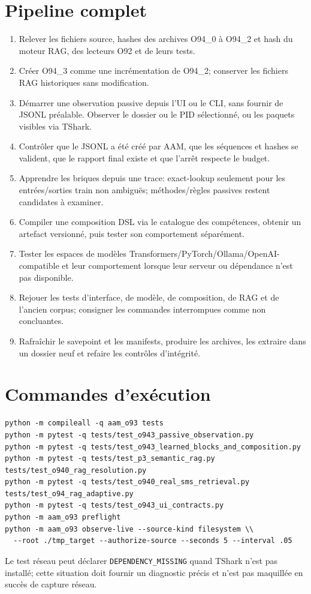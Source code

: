 \documentclass[11pt,a4paper]{article}
\begin{document}
\section{Pipeline complet}
\begin{enumerate}
\item Relever les fichiers source, hashes des archives O94\_0 à O94\_2 et hash du moteur RAG, des lecteurs O92 et de leurs tests.
\item Créer O94\_3 comme une incrémentation de O94\_2; conserver les fichiers RAG historiques sans modification.
\item Démarrer une observation passive depuis l'UI ou le CLI, sans fournir de JSONL préalable. Observer le dossier ou le PID sélectionné, ou les paquets visibles via TShark.
\item Contrôler que le JSONL a été créé par AAM, que les séquences et hashes se valident, que le rapport final existe et que l'arrêt respecte le budget.
\item Apprendre les briques depuis une trace: exact-lookup seulement pour les entrées/sorties train non ambiguës; méthodes/règles passives restent candidates à examiner.
\item Compiler une composition DSL via le catalogue des compétences, obtenir un artefact versionné, puis tester son comportement séparément.
\item Tester les espaces de modèles Transformers/PyTorch/Ollama/OpenAI-compatible et leur comportement lorsque leur serveur ou dépendance n'est pas disponible.
\item Rejouer les tests d'interface, de modèle, de composition, de RAG et de l'ancien corpus; consigner les commandes interrompues comme non concluantes.
\item Rafraîchir le savepoint et les manifests, produire les archives, les extraire dans un dossier neuf et refaire les contrôles d'intégrité.
\end{enumerate}

\section{Commandes d'exécution}
\begin{verbatim}
python -m compileall -q aam_o93 tests
python -m pytest -q tests/test_o943_passive_observation.py
python -m pytest -q tests/test_o943_learned_blocks_and_composition.py
python -m pytest -q tests/test_p3_semantic_rag.py tests/test_o940_rag_resolution.py
python -m pytest -q tests/test_o940_real_sms_retrieval.py tests/test_o94_rag_adaptive.py
python -m pytest -q tests/test_o943_ui_contracts.py
python -m aam_o93 preflight
python -m aam_o93 observe-live --source-kind filesystem \\
  --root ./tmp_target --authorize-source --seconds 5 --interval .05
\end{verbatim}
Le test réseau peut déclarer \texttt{DEPENDENCY\_MISSING} quand TShark n'est pas installé; cette situation doit fournir un diagnostic précis et n'est pas maquillée en succès de capture réseau.
\end{document}
